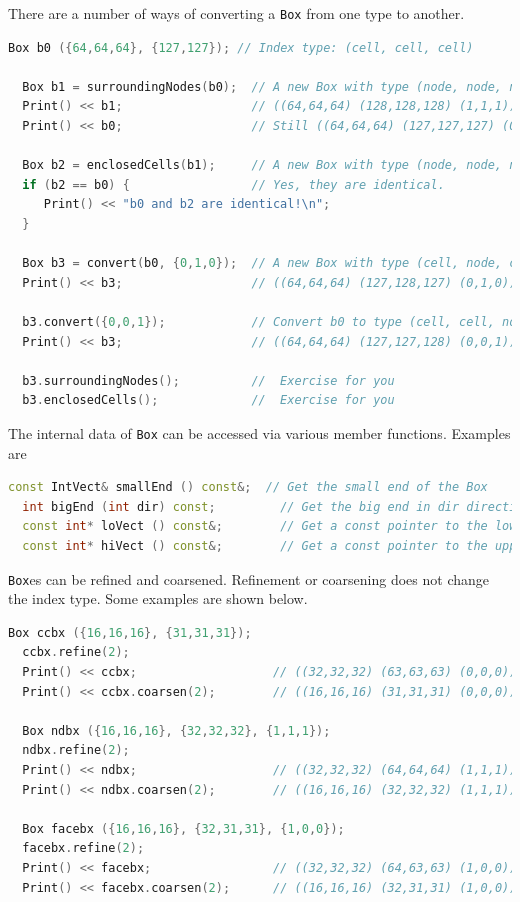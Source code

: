 {There are a number of ways of converting a {\tt Box} from one type to
another.
\begin{lstlisting}[language=cpp]
  Box b0 ({64,64,64}, {127,127}); // Index type: (cell, cell, cell)

  Box b1 = surroundingNodes(b0);  // A new Box with type (node, node, node)
  Print() << b1;                  // ((64,64,64) (128,128,128) (1,1,1))
  Print() << b0;                  // Still ((64,64,64) (127,127,127) (0,0,0))

  Box b2 = enclosedCells(b1);     // A new Box with type (node, node, node)
  if (b2 == b0) {                 // Yes, they are identical.
     Print() << "b0 and b2 are identical!\n";
  }

  Box b3 = convert(b0, {0,1,0});  // A new Box with type (cell, node, cell)
  Print() << b3;                  // ((64,64,64) (127,128,127) (0,1,0))

  b3.convert({0,0,1});            // Convert b0 to type (cell, cell, node)
  Print() << b3;                  // ((64,64,64) (127,127,128) (0,0,1))

  b3.surroundingNodes();          //  Exercise for you
  b3.enclosedCells();             //  Exercise for you
\end{lstlisting}

The internal data of {\tt Box} can be accessed via various member functions.
Examples are
\begin{lstlisting}[language=cpp]
  const IntVect& smallEnd () const&;  // Get the small end of the Box
  int bigEnd (int dir) const;         // Get the big end in dir direction
  const int* loVect () const&;        // Get a const pointer to the lower end
  const int* hiVect () const&;        // Get a const pointer to the upper end
\end{lstlisting}

{\tt Box}es can be refined and coarsened.  Refinement or coarsening
does not change the index type.  Some examples are shown below.
\begin{lstlisting}[language=cpp]
  Box ccbx ({16,16,16}, {31,31,31});
  ccbx.refine(2);
  Print() << ccbx;                   // ((32,32,32) (63,63,63) (0,0,0))
  Print() << ccbx.coarsen(2);        // ((16,16,16) (31,31,31) (0,0,0))

  Box ndbx ({16,16,16}, {32,32,32}, {1,1,1});
  ndbx.refine(2);
  Print() << ndbx;                   // ((32,32,32) (64,64,64) (1,1,1))
  Print() << ndbx.coarsen(2);        // ((16,16,16) (32,32,32) (1,1,1))

  Box facebx ({16,16,16}, {32,31,31}, {1,0,0});
  facebx.refine(2);
  Print() << facebx;                 // ((32,32,32) (64,63,63) (1,0,0))
  Print() << facebx.coarsen(2);      // ((16,16,16) (32,31,31) (1,0,0))


\end{lstlisting}}
